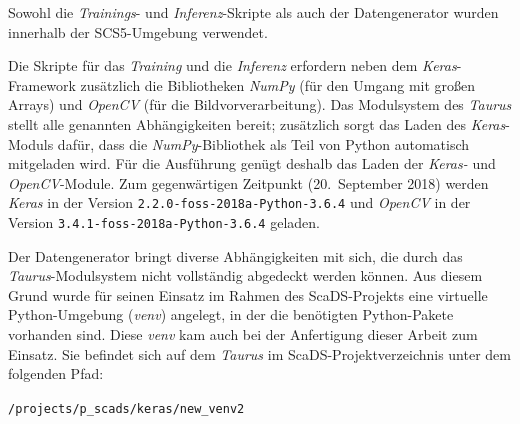 Sowohl die \textit{Trainings}- und \textit{Inferenz}-Skripte als auch der Datengenerator wurden innerhalb der
SCS5-Umgebung verwendet.

Die Skripte für das \textit{Training} und die \textit{Inferenz} erfordern neben dem \textit{Keras}-Framework zusätzlich
die Bibliotheken \textit{NumPy} (für den Umgang mit großen Arrays) und \textit{OpenCV} (für die Bildvorverarbeitung).
Das Modulsystem des \textit{Taurus} stellt alle genannten Abhängigkeiten bereit; zusätzlich sorgt das Laden des
\textit{Keras}-Moduls dafür, dass die \textit{NumPy}-Bibliothek als Teil von Python automatisch mitgeladen wird. Für die
Ausführung genügt deshalb das Laden der \textit{Keras-} und \textit{OpenCV}-Module. Zum gegenwärtigen Zeitpunkt
(20.\ September 2018) werden \textit{Keras} in der Version \texttt{2.2.0-foss-2018a-Python-3.6.4} und \textit{OpenCV} in
der Version \texttt{3.4.1-foss-2018a-Python-3.6.4} geladen.

Der Datengenerator bringt diverse Abhängigkeiten mit sich, die durch das \textit{Taurus}-Modulsystem nicht vollständig
abgedeckt werden können. Aus diesem Grund wurde für seinen Einsatz im Rahmen des ScaDS-Projekts eine virtuelle
Python-Umgebung (\textit{venv}) angelegt, in der die benötigten Python-Pakete vorhanden sind. Diese \textit{venv} kam
auch bei der Anfertigung dieser Arbeit zum Einsatz. Sie befindet sich auf dem \textit{Taurus} im
ScaDS-Projektverzeichnis unter dem folgenden Pfad:

\texttt{/projects/p\_scads/keras/new\_venv2}
